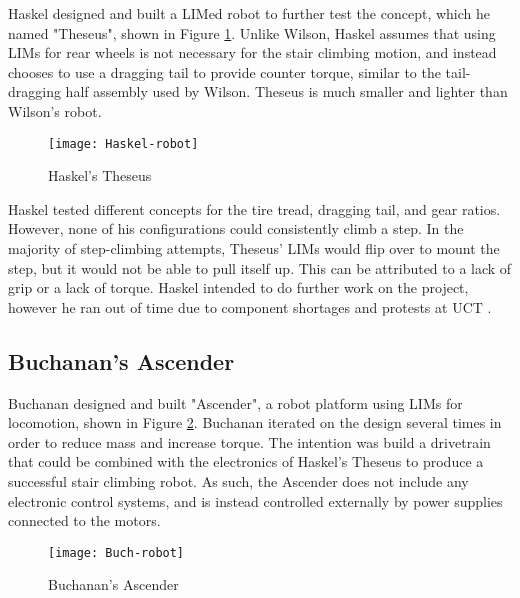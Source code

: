Haskel designed and built a LIMed robot to further test the concept, which he named "Theseus", shown in Figure \ref{Haskel robot}. Unlike Wilson, Haskel assumes that using LIMs for rear wheels is not necessary for the stair climbing motion, and instead chooses to use a dragging tail to provide counter torque, similar to the tail-dragging half assembly used by Wilson. Theseus is much smaller and lighter than Wilson's robot.

\begin{figure}[h]
	\centering
	\texttt{[image: Haskel-robot]}
	\caption{Haskel's Theseus \citep{Haskel-2017}}
	\label{Haskel robot}
\end{figure}

Haskel tested different concepts for the tire tread, dragging tail, and gear ratios. However, none of his configurations could consistently climb a step. In the majority of step-climbing attempts, Theseus' LIMs would flip over to mount the step, but it would not be able to pull itself up. This can be attributed to a lack of grip or a lack of torque. Haskel intended to do further work on the project, however he ran out of time due to component shortages and protests at UCT \citep{Haskel-2017}.

\subsection{Buchanan's Ascender} %

Buchanan designed and built "Ascender", a robot platform using LIMs for locomotion, shown in Figure \ref{Buch robot}. Buchanan iterated on the design several times in order to reduce mass and increase torque. The intention was build a drivetrain that could be combined with the electronics of Haskel's Theseus to produce a successful stair climbing robot. As such, the Ascender does not include any electronic control systems, and is instead controlled externally by power supplies connected to the motors.

\begin{figure}[h]
	\centering
	\texttt{[image: Buch-robot]}
	\caption{Buchanan's Ascender \citep{Buchanan-2018}}
	\label{Buch robot}
\end{figure}

